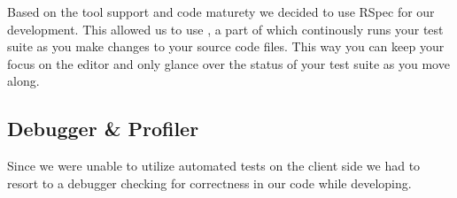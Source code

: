 Based on the tool support and code maturety we decided to use RSpec for our
development. This allowed us to use , a part of
%
which continously runs your test suite as you make changes to your source code
files. This way you can keep your focus on the editor and only glance over the
status of your test suite as you move along.

\subsection{Debugger \& Profiler}

Since we were unable to utilize automated tests on the client side we had to
resort to a debugger checking for correctness in our code while developing.
